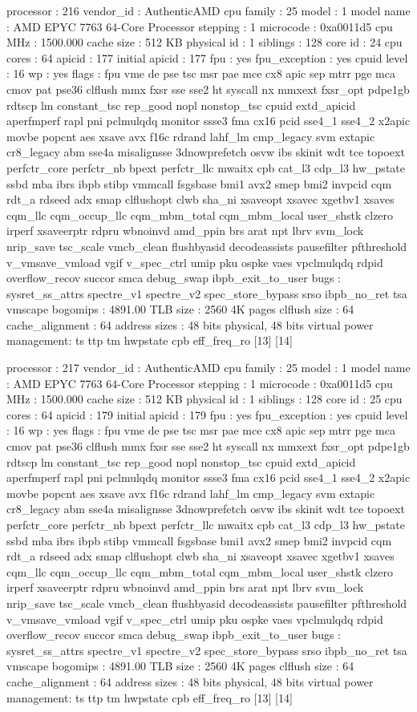 processor	: 216
vendor_id	: AuthenticAMD
cpu family	: 25
model		: 1
model name	: AMD EPYC 7763 64-Core Processor
stepping	: 1
microcode	: 0xa0011d5
cpu MHz		: 1500.000
cache size	: 512 KB
physical id	: 1
siblings	: 128
core id		: 24
cpu cores	: 64
apicid		: 177
initial apicid	: 177
fpu		: yes
fpu_exception	: yes
cpuid level	: 16
wp		: yes
flags		: fpu vme de pse tsc msr pae mce cx8 apic sep mtrr pge mca cmov pat pse36 clflush mmx fxsr sse sse2 ht syscall nx mmxext fxsr_opt pdpe1gb rdtscp lm constant_tsc rep_good nopl nonstop_tsc cpuid extd_apicid aperfmperf rapl pni pclmulqdq monitor ssse3 fma cx16 pcid sse4_1 sse4_2 x2apic movbe popcnt aes xsave avx f16c rdrand lahf_lm cmp_legacy svm extapic cr8_legacy abm sse4a misalignsse 3dnowprefetch osvw ibs skinit wdt tce topoext perfctr_core perfctr_nb bpext perfctr_llc mwaitx cpb cat_l3 cdp_l3 hw_pstate ssbd mba ibrs ibpb stibp vmmcall fsgsbase bmi1 avx2 smep bmi2 invpcid cqm rdt_a rdseed adx smap clflushopt clwb sha_ni xsaveopt xsavec xgetbv1 xsaves cqm_llc cqm_occup_llc cqm_mbm_total cqm_mbm_local user_shstk clzero irperf xsaveerptr rdpru wbnoinvd amd_ppin brs arat npt lbrv svm_lock nrip_save tsc_scale vmcb_clean flushbyasid decodeassists pausefilter pfthreshold v_vmsave_vmload vgif v_spec_ctrl umip pku ospke vaes vpclmulqdq rdpid overflow_recov succor smca debug_swap ibpb_exit_to_user
bugs		: sysret_ss_attrs spectre_v1 spectre_v2 spec_store_bypass srso ibpb_no_ret tsa vmscape
bogomips	: 4891.00
TLB size	: 2560 4K pages
clflush size	: 64
cache_alignment	: 64
address sizes	: 48 bits physical, 48 bits virtual
power management: ts ttp tm hwpstate cpb eff_freq_ro [13] [14]

processor	: 217
vendor_id	: AuthenticAMD
cpu family	: 25
model		: 1
model name	: AMD EPYC 7763 64-Core Processor
stepping	: 1
microcode	: 0xa0011d5
cpu MHz		: 1500.000
cache size	: 512 KB
physical id	: 1
siblings	: 128
core id		: 25
cpu cores	: 64
apicid		: 179
initial apicid	: 179
fpu		: yes
fpu_exception	: yes
cpuid level	: 16
wp		: yes
flags		: fpu vme de pse tsc msr pae mce cx8 apic sep mtrr pge mca cmov pat pse36 clflush mmx fxsr sse sse2 ht syscall nx mmxext fxsr_opt pdpe1gb rdtscp lm constant_tsc rep_good nopl nonstop_tsc cpuid extd_apicid aperfmperf rapl pni pclmulqdq monitor ssse3 fma cx16 pcid sse4_1 sse4_2 x2apic movbe popcnt aes xsave avx f16c rdrand lahf_lm cmp_legacy svm extapic cr8_legacy abm sse4a misalignsse 3dnowprefetch osvw ibs skinit wdt tce topoext perfctr_core perfctr_nb bpext perfctr_llc mwaitx cpb cat_l3 cdp_l3 hw_pstate ssbd mba ibrs ibpb stibp vmmcall fsgsbase bmi1 avx2 smep bmi2 invpcid cqm rdt_a rdseed adx smap clflushopt clwb sha_ni xsaveopt xsavec xgetbv1 xsaves cqm_llc cqm_occup_llc cqm_mbm_total cqm_mbm_local user_shstk clzero irperf xsaveerptr rdpru wbnoinvd amd_ppin brs arat npt lbrv svm_lock nrip_save tsc_scale vmcb_clean flushbyasid decodeassists pausefilter pfthreshold v_vmsave_vmload vgif v_spec_ctrl umip pku ospke vaes vpclmulqdq rdpid overflow_recov succor smca debug_swap ibpb_exit_to_user
bugs		: sysret_ss_attrs spectre_v1 spectre_v2 spec_store_bypass srso ibpb_no_ret tsa vmscape
bogomips	: 4891.00
TLB size	: 2560 4K pages
clflush size	: 64
cache_alignment	: 64
address sizes	: 48 bits physical, 48 bits virtual
power management: ts ttp tm hwpstate cpb eff_freq_ro [13] [14]

